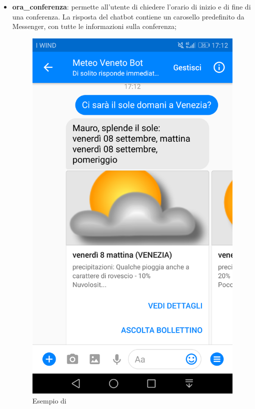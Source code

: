 \begin{itemize}
\begin{figure}[h!]
	\end{figure}		
	\item \textbf{ora\_conferenza}: permette all'utente di chiedere l'orario di inizio e di fine di una conferenza. La risposta del \gls{chatbot} contiene un carosello predefinito da Messenger, con tutte le informazioni sulla conferenza;
	\begin{figure}[h!]
		\centering
		\includegraphics[scale=0.12]{../Immagini/richiesta_sole.png}
		\caption{Esempio di }
	\end{figure}		

\end{itemize}
